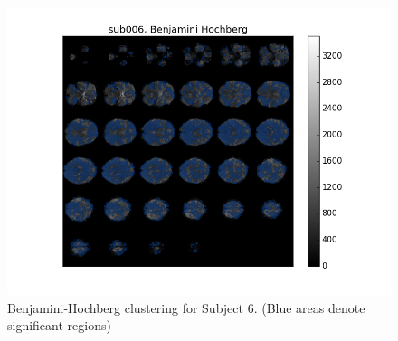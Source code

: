 \begin{figure}[H]
\begin{minipage}[b]{.66\linewidth}
	\centering
		\includegraphics[width=.8\linewidth]{../images/sub006_bh_overlay.png} 
	\caption{Benjamini-Hochberg clustering for Subject 6. 
	(Blue areas denote significant regions)}
	\label{fig:clusterBH}
\end{minipage}
\end{figure}


